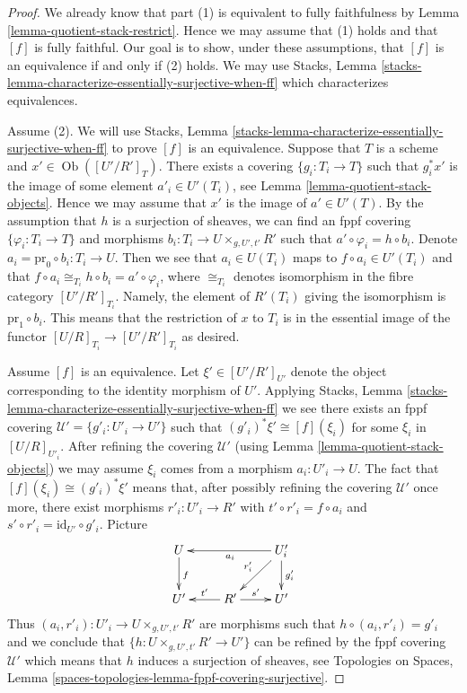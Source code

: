 \documentclass{stacks-project}
\theoremstyle{plain}
\theoremstyle{definition}
\theoremstyle{remark}
\numberwithin{equation}{subsection}
\def\Ob{\mathop{\mathrm{Ob}}\nolimits}
\begin{document}
\begin{proof}
We already know that part (1) is equivalent to
fully faithfulness by
Lemma \ref{lemma-quotient-stack-restrict}.
Hence we may assume that (1) holds and that $[f]$ is fully faithful.
Our goal is to show, under these assumptions, that $[f]$ is an equivalence
if and only if (2) holds. We may use
Stacks, Lemma \ref{stacks-lemma-characterize-essentially-surjective-when-ff}
which characterizes equivalences.

\medskip\noindent
Assume (2). We will use
Stacks, Lemma \ref{stacks-lemma-characterize-essentially-surjective-when-ff}
to prove $[f]$ is an equivalence.
Suppose that $T$ is a scheme and $x' \in \Ob([U'/R']_T)$.
There exists a covering $\{g_i : T_i \to T\}$ such that $g_i^*x'$
is the image of some element $a'_i \in U'(T_i)$, see
Lemma \ref{lemma-quotient-stack-objects}.
Hence we may assume that $x'$ is the image of $a' \in U'(T)$.
By the assumption that $h$ is a surjection of sheaves, we
can find an fppf covering $\{\varphi_i : T_i \to T\}$ and morphisms
$b_i : T_i \to U \times_{g, U', t'} R'$ such that
$a' \circ \varphi_i = h \circ b_i$. Denote
$a_i = \text{pr}_0 \circ b_i : T_i \to U$. Then we see that
$a_i \in U(T_i)$ maps to $f \circ a_i \in U'(T_i)$ and
that $f \circ a_i \cong_{T_i} h \circ b_i = a' \circ \varphi_i$,
where $\cong_{T_i}$ denotes isomorphism in the fibre category
$[U'/R']_{T_i}$. Namely, the element of $R'(T_i)$ giving the isomorphism
is $\text{pr}_1 \circ b_i$. This means that the restriction
of $x$ to $T_i$ is in the essential image of the functor
$[U/R]_{T_i} \to [U'/R']_{T_i}$ as desired.

\medskip\noindent
Assume $[f]$ is an equivalence. Let $\xi' \in [U'/R']_{U'}$ denote the
object corresponding to the identity morphism of $U'$. Applying
Stacks, Lemma \ref{stacks-lemma-characterize-essentially-surjective-when-ff}
we see there exists an fppf covering $\mathcal{U}' = \{g'_i : U'_i \to U'\}$
such that $(g'_i)^*\xi' \cong [f](\xi_i)$ for some $\xi_i$ in $[U/R]_{U'_i}$.
After refining the covering $\mathcal{U}'$ (using
Lemma \ref{lemma-quotient-stack-objects})
we may assume $\xi_i$ comes from a morphism $a_i : U'_i \to U$.
The fact that $[f](\xi_i) \cong (g'_i)^*\xi'$ means that, after possibly
refining the covering $\mathcal{U}'$ once more, there exist morphisms
$r'_i : U'_i \to R'$ with $t' \circ r'_i = f \circ a_i$ and
$s' \circ r'_i = \text{id}_{U'} \circ g'_i$. Picture
$$
\xymatrix{
U \ar[d]^f & & U'_i \ar[ll]^{a_i} \ar[ld]_{r'_i} \ar[d]^{g'_i} \\
U' & R' \ar[l]_{t'} \ar[r]^{s'} & U'
}
$$
Thus $(a_i, r'_i) : U'_i \to U \times_{g, U', t'} R'$ are morphisms
such that $h \circ (a_i, r'_i) = g'_i$ and we conclude that
$\{h : U \times_{g, U', t'} R' \to U'\}$ can be refined by the
fppf covering $\mathcal{U}'$ which means that $h$ induces a surjection
of sheaves, see
Topologies on Spaces, Lemma
\ref{spaces-topologies-lemma-fppf-covering-surjective}.


\end{proof}
\end{document}

